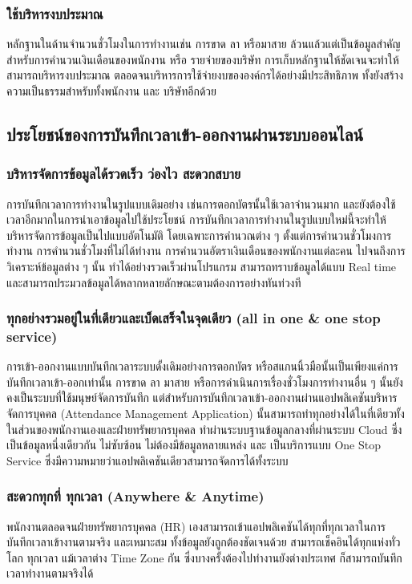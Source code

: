 \subsubsection{ใช้บริหารงบประมาณ}
\quad หลักฐานในด้านจำนวนชั่วโมงในการทำงานเช่น การขาด ลา หรือมาสาย ล้วนแล้วแต่เป็นข้อมูลสำคัญสำหรับการคำนวนเงินเดือนของพนักงาน หรือ รายจ่ายของบริษัท 
การเก็บหลักฐานให้ชัดเจนจะทำให้สามารถบริหารงบประมาณ ตลอดจนบริหารการใช้จ่ายงบขององค์กรได้อย่างมีประสิทธิภาพ ทั้งยังสร้างความเป็นธรรมสำหรับทั้งพนักงาน และ บริษัทอีกด้วย

\subsection{ประโยชน์ของการบันทึกเวลาเข้า-ออกงานผ่านระบบออนไลน์}
\subsubsection{บริหารจัดการข้อมูลได้รวดเร็ว ว่องไว สะดวกสบาย}
\quad การบันทึกเวลาการทำงานในรูปแบบเดิมอย่าง เช่นการตอกบัตรนั้นใช้เวลาจำนวนมาก และยังต้องใช้เวลาอีกมากในการนำเอาข้อมูลไปใช้ประโยชน์ 
การบันทึกเวลาการทำงานในรูปแบบใหม่นี้จะทำให้บริหารจัดการข้อมูลเป็นไปแบบอัตโนมัติ โดยเฉพาะการคำนวณต่าง ๆ ตั้งแต่การคำนวนชั่วโมงการทำงาน การคำนวนชั่วโมงที่ไม่ได้ทำงาน การคำนวนอัตราเงินเดือนของพนักงานแต่ละคน ไปจนถึงการวิเคราะห์ข้อมูลต่าง ๆ นั้น ทำได้อย่างรวดเร็วผ่านโปรแกรม สามารถทราบข้อมูลได้แบบ Real time และสามารถประมวลข้อมูลได้หลากหลายลักษณะตามต้องการอย่างทันท่วงที 
\subsubsection{ทุกอย่างรวมอยู่ในที่เดียวและเบ็ดเสร็จในจุดเดียว (all in one \& one stop service)}
\quad การเข้า-ออกงานแบบบันทึกเวลาระบบดั้งเดิมอย่างการตอกบัตร หรือสแกนนิ้วมือนั้นเป็นเพียงแค่การบันทึกเวลาเข้า-ออกเท่านั้น 
การขาด ลา มาสาย หรือการดำเนินการเรื่องชั่วโมงการทำงานอื่น ๆ นั้นยังคงเป็นระบบที่ใช้มนุษย์จัดการบันทึก 
แต่สำหรับการบันทึกเวลาเข้า-ออกงานผ่านแอปพลิเคชันบริหารจัดการบุคคล (Attendance Management Application) 
นั้นสามารถทำทุกอย่างได้ในที่เดียวทั้งในส่วนของพนักงานเองและฝ่ายทรัพยากรบุคคล ทำผ่านระบบฐานข้อมูลกลางที่ผ่านระบบ Cloud ซึ่งเป็นข้อมูลหนึ่งเดียวกัน ไม่ซับซ้อน ไม่ต้องมีข้อมูลหลายแหล่ง และ
เป็นบริการแบบ One Stop Service ซึ่งมีความหมายว่าแอปพลิเคชันเดียวสามารถจัดการได้ทั้งระบบ 
\subsubsection{สะดวกทุกที่ ทุกเวลา (Anywhere \& Anytime)}
\quad พนักงานตลอดจนฝ่ายทรัพยากรบุคคล (HR) เองสามารถเข้าแอปพลิเคชันได้ทุกที่ทุกเวลาในการบันทึกเวลาเข้างานตามจริง และเหมาะสม
ทั้งข้อมูลยังถูกต้องชัดเจนด้วย สามารถเช็คอินได้ทุกแห่งทั่วโลก ทุกเวลา แม้เวลาต่าง Time Zone กัน ซึ่งบางครั้งต้องไปทำงานยังต่างประเทศ
ก็สามารถบันทึกเวลาทำงานตามจริงได้ 
